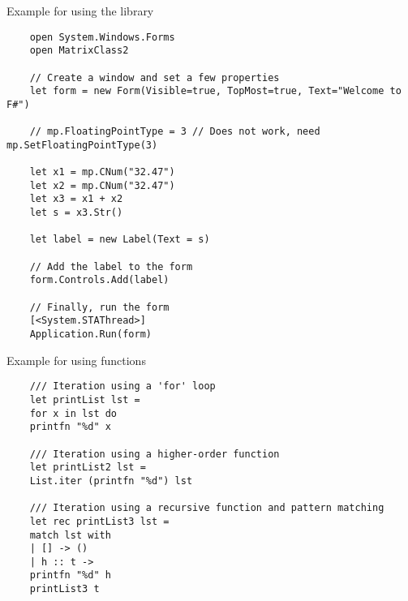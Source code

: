 	
	
	\vpara
	Example for using the library
	
	\begin{lstlisting}
	open System.Windows.Forms
	open MatrixClass2
	
	// Create a window and set a few properties
	let form = new Form(Visible=true, TopMost=true, Text="Welcome to F#")
	
	// mp.FloatingPointType = 3 // Does not work, need mp.SetFloatingPointType(3)
	
	let x1 = mp.CNum("32.47")
	let x2 = mp.CNum("32.47")
	let x3 = x1 + x2
	let s = x3.Str()
	
	let label = new Label(Text = s)
	
	// Add the label to the form
	form.Controls.Add(label)
	
	// Finally, run the form
	[<System.STAThread>]
	Application.Run(form)
	\end{lstlisting}
	
	
	
	
	\vpara
	Example for using functions
	
	\begin{lstlisting}
	/// Iteration using a 'for' loop
	let printList lst = 
	for x in lst do
	printfn "%d" x
	
	/// Iteration using a higher-order function
	let printList2 lst = 
	List.iter (printfn "%d") lst
	
	/// Iteration using a recursive function and pattern matching
	let rec printList3 lst =
	match lst with
	| [] -> ()
	| h :: t ->
	printfn "%d" h
	printList3 t
	
	\end{lstlisting}
	
	
	
	
	
	
	
	
	

